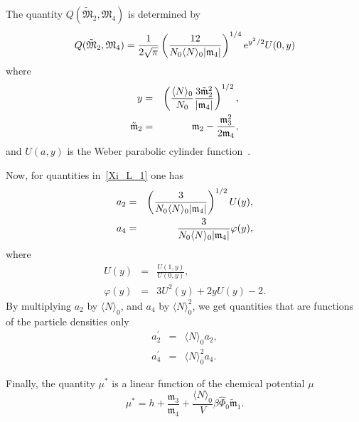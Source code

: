 The quantity $Q(\tilde{\mathfrak{M}}_2, \mathfrak{M}_4)$ is determined by
\begin{equation*}
	\label{quantity_Q}
	Q(\tilde{\mathfrak{M}}_2, \mathfrak{M}_4) = \frac{1}{2\sqrt{\pi}} \left(\frac{12}{N_0 \langle N \rangle_0\abs{\mathfrak{m}_4}}\right)^{1/4} {\rm e}^{y^2/2} U(0,y)
\end{equation*}
where
\begin{eqnarray*}
	y & = & \left(\frac{\langle N \rangle_0}{N_0} \frac{3\tilde{\mathfrak{m}}_2^2}{\abs{\mathfrak{m}_4}}\right)^{1/2},
	\\
	\tilde{\mathfrak{m}}_2 & = & \mathfrak{m}_2 - \frac{\mathfrak{m}_3^2}{2\mathfrak{m}_4},
\end{eqnarray*}
and $U(a, y)$ is the Weber parabolic cylinder function~\cite{nistMathFuncHandbook2010}.

Now, for quantities in~\eqref{Xi_L_1} one has
\begin{eqnarray*}
	a_2 & = & \left(\frac{3}{N_0 \langle N \rangle_0 \abs{\mathfrak{m}_4}}\right)^{1/2} U(y),
	\\
	a_4 & = & \frac{3}{N_0 \langle N \rangle_0 \abs{\mathfrak{m}_4}} \varphi(y),
\end{eqnarray*}
where
\begin{eqnarray*}
	U(y) & = & \frac{U(1,y)}{U(0,y)},
	\\
	\varphi(y) & = & 3U^2(y) + 2yU(y) -2.
\end{eqnarray*}
By multiplying $a_2$ by $\langle N \rangle_0$, and $a_4$ by $\langle N \rangle_0^2$, we get quantities that are functions of the particle densities only
\begin{eqnarray*}
	a_2^{'} & = & \langle N \rangle_0 a_2,
	\\
	a_4^{'} & = & \langle N \rangle_0^2 a_4.
\end{eqnarray*}

Finally, the quantity $\mu^*$ is a linear function of the chemical potential $\mu$
\begin{equation*}
	\mu^* = h + \frac{\mathfrak{m}_3}{\mathfrak{m}_4} + \frac{\langle N \rangle_0}{V} \beta\hat{\Phi}_0 \tilde{\mathfrak{m}}_1.
\end{equation*}